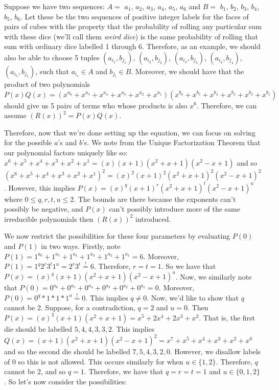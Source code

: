 \documentclass[12pt]{report}
\begin{document}
Suppose we have two sequences: $A=$ $a_{1}$, $a_{2}$, $a_{3}$, $a_{4}$, $a_{5}$, $a_{6}$ and $B=$ $b_{1}$, $b_{2}$, $b_{3}$, $b_{4}$, $b_{5}$, $b_{6}$. Let these be the two sequences of positive integer labels for the faces of pairs of cubes with the property that the probability of rolling any particular sum with these dice (we'll call them \textit{weird dice}) is the same probability of rolling that sum with ordinary dice labelled 1 through 6. Therefore, as an example, we should also be able to choose 5 tuples $(a_{i_{1}}, b_{j_{1}})$, $(a_{i_{2}}, b_{j_{2}})$, $(a_{i_{3}}, b_{j_{3}})$, $(a_{i_{4}}, b_{j_{4}})$, $(a_{i_{5}}, b_{j_{5}})$, such that $a_{i_{s}} \in A$ and $b_{j_{t}} \in B$. Moreover, we should have that the product of two polynomials $P(x)Q(x)=(x^{a_{6}}+x^{a_{5}}+x^{a_{4}}+x^{a_{3}}+x^{a_{2}}+x^{a_{1}})
(x^{b_{6}}+x^{b_{5}}+x^{b_{4}}+x^{b_{3}}+x^{b_{2}}+x^{b_{1}})$ should give us 5 pairs of terms who whose products is also $x^{6}$. Therefore, we can assume $(R(x))^{2}=P(x)Q(x)$.

Therefore, now that we're done setting up the equation, we can focus on solving for the possible $a$'s and $b$'s. We note from the Unique Factorization Theorem that our polynomial factors uniquely like so: $x^{6}+x^{5}+x^{4}+x^{3}+x^{2}+x^{1} = (x)(x+1)(x^{2}+x+1)(x^{2}-x+1)$ and so $(x^{6}+x^{5}+x^{4}+x^{3}+x^{2}+x^{1})^2 = (x)^{2}(x+1)^{2}(x^{2}+x+1)^{2}(x^{2}-x+1)^{2}$. However, this implies $P(x)=(x)^{q}(x+1)^{r}(x^{2}+x+1)^{t}(x^{2}-x+1)^{u}$ where $0\leq q,r,t,u \leq 2$. The bounds are there because the exponents can't possibly be negative, and $P(x)$ can't possibly introduce more of the same irreducible polynomials then $(R(x))^2$ introduced.

We now restrict the possibilities for these four parameters by evaluating $P(0)$ and $P(1)$ in two ways. Firstly, note $P(1)=1^{a_{6}}+1^{a_{5}}+1^{a_{4}}+1^{a_{3}}+1^{a_{2}}+1^{a_{1}}=6$. Moreover, $P(1)=1^{q}2^{r}3^{t}1^{u}=2^{r}3^{t} \stackrel{!}{=} 6$. Therefore, $r=t=1$. So we have that $P(x)=(x)^{q}(x+1)(x^{2}+x+1)(x^{2}-x+1)^{u}$. Now, we similarly note that $P(0)=0^{a_{6}}+0^{a_{5}}+0^{a_{4}}+0^{a_{3}}+0^{a_{2}}+0^{a_{1}}=0$. Moreover, $P(0)=0^{q}*1*1*1^{u} \stackrel{!}{=} 0$. This implies $q \neq 0$. Now, we'd like to show that $q$ cannot be 2. Suppose, for a contradiction, $q=2$ and $u=0$. Then $P(x)=(x)^{2}(x+1)(x^{2}+x+1)=x^{5}+2x^{4}+2x^{3}+x^{2}$. That is, the first die should be labelled $5,4,4,3,3,2$. This implies $Q(x)=(x+1)(x^{2}+x+1)(x^{2}-x+1)^{2}=x^{7}+x^{5}+x^{4}+x^{3}+x^{2}+x^{0}$ and so the second die should be labelled $7,5,4,3,2,0$. However, we disallow labels of $0$ so this is not allowed. This occurs similarly for when $u\in \{1,2\}$. Therefore, $q$ cannot be $2$, and so $q=1$. Therefore, we have that $q=r=t=1$ and $u\in \{0,1,2\}$. So let's now consider the possibilities:
\end{document}
